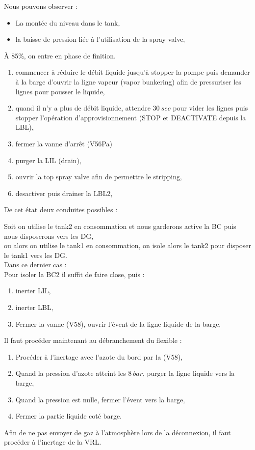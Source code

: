 \documentclass[12pt,a4paper]{article}
\begin{document}
\newpage
Nous pouvons observer :
\begin{itemize}
 \item La montée du niveau dans le tank,
 \item la baisse de pression liée à l'utilisation de la spray valve,
\end{itemize}

À 85\%, on entre en phase de finition.


\begin{enumerate}[resume]
 \item commencer à réduire le débit liquide jusqu'à stopper la pompe puis demander à la barge d'ouvrir la ligne vapeur (vapor bunkering) afin de pressuriser les lignes pour pousser le liquide,
 \item quand il n'y a plus de débit liquide, attendre $30~sec$ pour vider les lignes puis stopper l'opération d'approvisionnement (STOP et DEACTIVATE depuis la LBL), 
 \item fermer la vanne d'arrêt (V56Pa)
 \item purger la LIL (drain),
 \item ouvrir la top spray valve afin de permettre le stripping,
 \item  desactiver puis drainer la LBL2,
\end{enumerate}


De cet état deux conduites possibles :

Soit on utilise le tank2 en consommation et nous garderons active la BC puis nous disposerons vers les DG, \\
ou alors on utilise le tank1 en consommation, on isole alors le tank2 pour disposer le tank1 vers les DG.\\

Dans ce dernier cas :\\
Pour isoler la BC2 il suffit de faire close, puis :
\begin{enumerate}[resume]

 \item inerter LIL,
 \item inerter LBL,
 \item Fermer la vanne (V58), ouvrir l'évent de la ligne liquide de la barge,
\end{enumerate}

 Il faut procéder maintenant au débranchement du flexible :
 
\begin{enumerate}[resume]
 \item Procéder à l'inertage avec l'azote du bord par la (V58), 
 \item Quand la pression d'azote atteint les $8~bar$, purger la ligne liquide 
vers la barge,
 \item Quand la pression est nulle, fermer l'évent vers la barge,
 \item Fermer la partie liquide coté barge.
\end{enumerate}
Afin de ne pas envoyer de gaz à l'atmosphère lors de la déconnexion, il faut 
procéder à l'inertage de la VRL.
\end{document}
